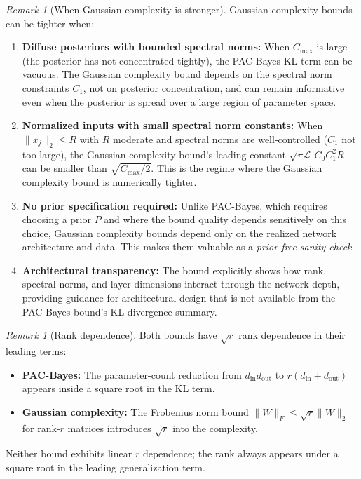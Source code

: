 \documentclass{article}
\theoremstyle{plain}
\theoremstyle{definition}
\theoremstyle{remark}
\newtheorem{remark}[theorem]{Remark}
\begin{document}
\begin{remark}[When Gaussian complexity is stronger]
Gaussian complexity bounds can be tighter when:
\begin{enumerate}
    \item \textbf{Diffuse posteriors with bounded spectral norms:} When $C_{\max}$ is large (the posterior has not concentrated tightly), the PAC-Bayes KL term can be vacuous. The Gaussian complexity bound depends on the spectral norm constraints $C_1$, not on posterior concentration, and can remain informative even when the posterior is spread over a large region of parameter space.
    \item \textbf{Normalized inputs with small spectral norm constants:} When $\|x_j\|_2 \le R$ with $R$ moderate and spectral norms are well-controlled ($C_1$ not too large), the Gaussian complexity bound's leading constant $\sqrt{\pi\mathcal{L}}\,C_0 C_1^2 R$ can be smaller than $\sqrt{C_{\max}/2}$. This is the regime where the Gaussian complexity bound is numerically tighter.
    \item \textbf{No prior specification required:} Unlike PAC-Bayes, which requires choosing a prior $P$ and where the bound quality depends sensitively on this choice, Gaussian complexity bounds depend only on the realized network architecture and data. This makes them valuable as a \emph{prior-free sanity check}.
    \item \textbf{Architectural transparency:} The bound explicitly shows how rank, spectral norms, and layer dimensions interact through the network depth, providing guidance for architectural design that is not available from the PAC-Bayes bound's KL-divergence summary.
\end{enumerate}
\end{remark}

\begin{remark}[Rank dependence]
Both bounds have $\sqrt{r}$ rank dependence in their leading terms:
\begin{itemize}
    \item \textbf{PAC-Bayes:} The parameter-count reduction from $d_{\text{in}} d_{\text{out}}$ to $r(d_{\text{in}} + d_{\text{out}})$ appears inside a square root in the KL term.
    \item \textbf{Gaussian complexity:} The Frobenius norm bound $\|W\|_F \le \sqrt{r}\|W\|_2$ for rank-$r$ matrices introduces $\sqrt{r}$ into the complexity.
\end{itemize}
Neither bound exhibits linear $r$ dependence; the rank always appears under a square root in the leading generalization term.
\end{remark}
\end{document}
